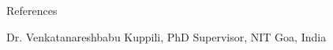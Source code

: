 
\prefix{}
\begin{rubric}{References}

{\large Dr. Venkatanareshbabu Kuppili, PhD Supervisor, NIT Goa, India\par}
\end{rubric}